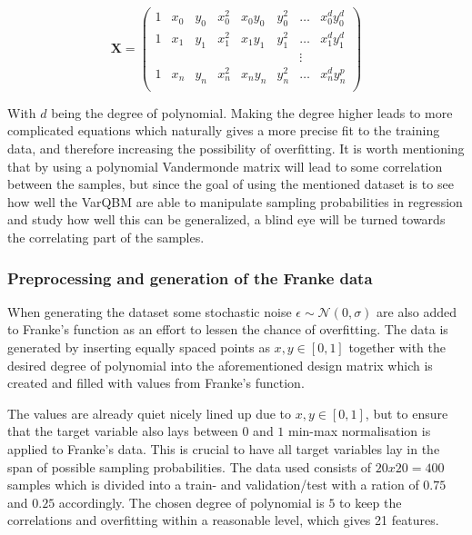\documentclass[../main.tex]{subfiles}
\begin{document}
\begin{equation*}
\mathbf X=  \begin{pmatrix}
   1& x_0 & y_0 & x_0^2 & x_0y_0 & y_0^2 & \ldots & x_0^d y_0^{d}\\
    1& x_1 & y_1 & x_1^2 & x_1y_1 & y_1^2 & \ldots & x_1^d y_1^{d}\\
    & &  &  &  &  & \vdots & \\
    1 & x_{n} & y_{n} & x_{n}^2 & x_{n}y_{n} & y_{n}^2 & \ldots & x_{n}^d y_{n}^{p}\\
 \end{pmatrix}
\end{equation*}

With $d$ being the degree of polynomial. Making the degree higher leads to more complicated equations which naturally gives a more precise fit to the training data, and therefore increasing the possibility of overfitting. It is worth mentioning that by using a polynomial Vandermonde matrix will lead to some correlation between the samples, but since the goal of using the mentioned dataset is to see how well the VarQBM are able to manipulate sampling probabilities in regression and study how well this can be generalized, a blind eye will be turned towards the correlating part of the samples.

\subsubsection{Preprocessing and generation of the Franke data}
When generating the dataset some stochastic noise \ensuremath{\epsilon\sim\mathcal{N}(0,\sigma)} are also added to Franke's function as an effort to lessen the chance of overfitting. The data is generated by inserting equally spaced points as \ensuremath{x,y \in [0,1]} together with the desired degree of polynomial into the aforementioned design matrix which is created and filled with values from Franke's function.

The values are already quiet nicely lined up due to \ensuremath{x,y \in [0,1]}, but to ensure that the target variable also lays between $0$ and $1$ min-max normalisation is applied to Franke's data. This is crucial to have all target variables lay in the span of possible sampling probabilities. The data used consists of $20x20=400$ samples which is divided into a train- and validation/test with a ration of $0.75$ and $0.25$ accordingly. The chosen degree of polynomial is $5$ to keep the correlations and overfitting within a reasonable level, which gives 21 features.
\end{document}
